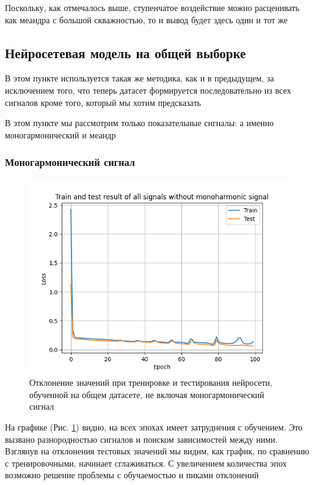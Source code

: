 Поскольку, как отмечалось выше, ступенчатое воздействие можно расценивать как меандра с большой скважностью, то и вывод будет здесь один и тот же

\subsection{Нейросетевая модель на общей выборке}

В этом пункте используется такая же методика, как и в предыдущем, за исключением того, что теперь
датасет формируется последовательно из всех сигналов кроме того, который мы хотим предсказать

В этом пункте мы рассмотрим только показательные сигналы: а именно моногармонический и меандр

\subsubsection{Моногармонический сигнал}

\begin{figure}[H]
	\centering
	\includegraphics[width=0.7\linewidth]{body/images/Train-and-test-result-of-all-signals-without-monoharmonic-signal.png}
	\caption{Отклонение значений при тренировке и тестирования нейросети, обученной на общем датасете, не включая моногармонический сигнал}
	\label{fig:27}
\end{figure}

На графике (Рис. \ref{fig:27}) видно, на всех эпохах имеет затруднения с обучением. Это вызвано разнородностью сигналов и поиском зависимостей между ними.
Взглянув на отклонения тестовых значений мы видим, как график, по сравнению с тренировочными, начинает сглаживаться. С увеличением количества эпох возможно решение
проблемы с обучаемостью и пиками отклонений


